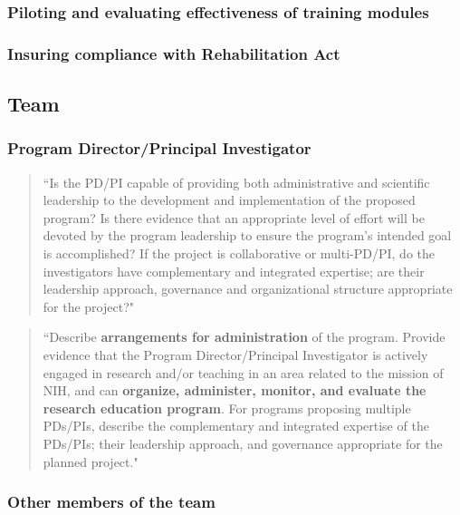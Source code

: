 \documentclass[pdftex,english,11pt,parskip=half]{scrartcl}
\begin{document}


\subsubsection{Piloting and evaluating effectiveness of training modules}

\subsubsection{Insuring compliance with Rehabilitation Act}

\subsection{Team}

\subsubsection{Program Director/Principal Investigator}

\begin{quotation}
``Is the PD/PI capable of providing both administrative and scientific leadership to the development and implementation of the proposed program? Is there evidence that an appropriate level of effort will be devoted by the program leadership to ensure the program's intended goal is accomplished? If the project is collaborative or multi-PD/PI, do the investigators have complementary and integrated expertise; are their leadership approach, governance and organizational structure appropriate for the project?"
\end{quotation}

\begin{quotation}
``Describe \textbf{arrangements for administration} of the program.  Provide evidence that the Program Director/Principal Investigator is actively engaged in research and/or teaching in an area related to the mission of NIH, and can \textbf{organize, administer, monitor, and evaluate the research education program}. For programs proposing multiple PDs/PIs, describe the complementary and integrated expertise of the PDs/PIs; their leadership approach, and governance appropriate for the planned project."
\end{quotation}

\subsubsection{Other members of the team}
\end{document}
